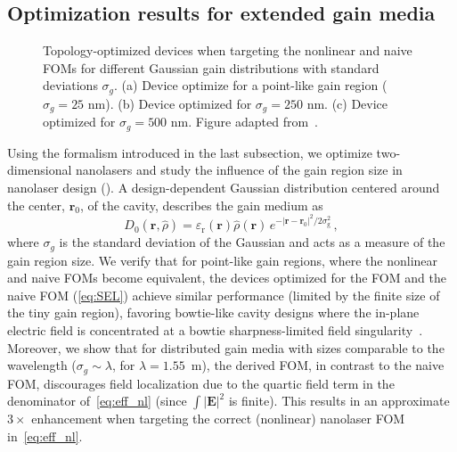 \subsection*{Optimization results for extended gain media}

\begin{figure}[tb]
    \centering
    \caption{Topology-optimized devices when targeting the nonlinear and naive FOMs for different Gaussian gain distributions with standard deviations $\sigma_g$. (a) Device optimize for a point-like gain region ($\sigma_g=25$ nm).
    (b) Device optimized for $\sigma_g=250$ nm. (c) Device optimized for $\sigma_g=500$ nm. Figure adapted from~\cite{ownpub4}.}
    \label{fig:laser_size}
\end{figure}

Using the formalism introduced in the last subsection, we optimize two-dimensional nanolasers and study the influence of the gain region size in 
nanolaser design (). A design-dependent Gaussian distribution centered around the center, $\mathbf{r}_0$, of the cavity, describes the gain medium as
\begin{equation}
D_0 (\mathbf{r}, \hat{\rho}) = \varepsilon_{\text{r}}(\mathbf{r})  \hat{\rho}(\mathbf{r}) \, e^{- \vert \mathbf{r}- \mathbf{r}_0 \vert^2 / 2 \sigma_{\text{g}}^2 }\,,
\end{equation}
where
$\sigma_g$ is the standard deviation of the Gaussian and acts as a measure of the gain region size. We verify that for point-like gain regions, where the nonlinear and naive FOMs become equivalent, the devices optimized for the FOM and the naive FOM (\eqref{eq:SEL})
achieve similar performance (limited by the finite size of the tiny gain region), favoring bowtie-like cavity designs
where the in-plane electric field is concentrated at a bowtie sharpness-limited field singularity~\cite{sing}. Moreover, we show that for distributed gain media with sizes comparable to the wavelength 
($\sigma_g \sim \lambda$, for $\lambda = 1.55$~\textmu m), 
the derived FOM, in contrast to the naive FOM, discourages field localization due to the quartic field term in the denominator of~\eqref{eq:eff_nl} 
(since $\int |\mathbf{E}|^2$ is finite). 
This results in an approximate $3\times$ enhancement when targeting the correct (nonlinear) nanolaser FOM in~\eqref{eq:eff_nl}.

